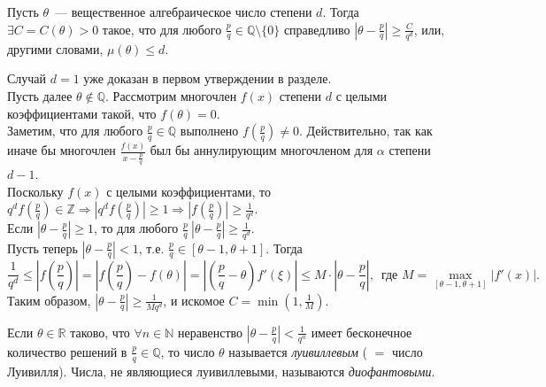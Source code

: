 \begin{theorem}[Лиувилля]  \label{l9_Liouv}
	Пусть $\theta$ — вещественное алгебраическое число степени $d$. Тогда $\exists C = C(\theta) > 0$ такое, что для любого $\displaystyle \frac{p}{q} \in \mathbb{Q} \setminus \lbrace 0 \rbrace$ справедливо $\displaystyle \left|\theta - \frac{p}{q}\right| \geq \frac{C}{q^d}$, или, другими словами, $\mu(\theta) \leq d$.
\end{theorem}
\begin{pf}
	Случай $d = 1$ уже доказан в первом утверждении в разделе.\\
	Пусть далее $\theta \not \in \mathbb{Q}$. Рассмотрим многочлен $f(x)$ степени $d$ с целыми коэффициентами такой, что $f(\theta) = 0$.\\
	Заметим, что для любого $\displaystyle \frac{p}{q} \in \mathbb{Q}$ выполнено $\displaystyle f\left(\frac{p}{q}\right) \ne 0$. Действительно, так как иначе бы многочлен $\displaystyle \frac{f(x)}{x - \frac{p}{q}}$ был бы аннулирующим многочленом для $\alpha$ степени $d - 1$.\\
	Поскольку $f(x)$ с целыми коэффициентами, то $\displaystyle q^d f\left(\frac{p}{q}\right) \in \mathbb{Z} \Rightarrow \left| q^d f\left(\frac{p}{q}\right) \right| \geq 1 \Rightarrow \left| f\left(\frac{p}{q}\right) \right| \geq \frac{1}{q^d}$.\\
	Если $\displaystyle \left| \theta - \frac{p}{q} \right| \geq 1$, то для любого $\displaystyle \frac{p}{q} \ \left|\theta - \frac{p}{q}\right| \geq \frac{1}{q^d}$.\\
	Пусть теперь $\displaystyle \left|\theta - \frac{p}{q}\right| < 1$, т.е. $\displaystyle \frac{p}{q} \in [\theta - 1, \theta + 1]$. Тогда
	$$\frac{1}{q^d} \leq \left| f\left(\frac{p}{q}\right)\right| = \left|f\left(\frac{p}{q}\right) - f\left(\theta\right)\right| = \left|\left(\frac{p}{q} - \theta\right)f'(\xi)\right| \leq M \cdot \left| \theta - \frac{p}{q} \right|, \, \text{ где } M = \max\limits_{[\theta-1,\theta+1]}\left| f'(x) \right|.$$
	Таким образом, $\displaystyle \left| \theta - \frac{p}{q} \right| \geq \frac{1}{Mq^d}$, и искомое $\displaystyle C = \min\left( 1, \frac{1}{M} \right)$.
\end{pf}

\begin{definition}
	Если $\theta \in \mathbb{R}$ таково, что $\forall n \in \mathbb{N}$ неравенство $\displaystyle \left|\theta - \frac{p}{q}\right| < \frac{1}{q^n}$ имеет бесконечное количество решений в $\displaystyle \frac{p}{q} \in \mathbb{Q}$, то число $\theta$  называется \textit{луивиллевым} ( $=$ число Луивилля). Числа, не являющиеся луивиллевыми, называются \textit{диофантовыми}.
\end{definition}

